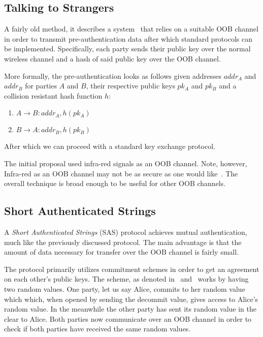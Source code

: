 \documentclass[conference, 12pt]{sty/IEEEtran}
\begin{document}
\subsection{Talking to Strangers}
\label{ssec:talking_to_strangers}

A fairly old method, it describes a system~\cite{balfanz2002talking} that relies on a suitable OOB channel in order to transmit pre-authentication data after which standard protocols can be implemented.
Specifically, each party sends their public key over the normal wireless channel and a hash of said public key over the OOB channel.

More formally, the pre-authentication looks as follows given addresses $addr_A$ and $addr_B$ for parties $A$ and $B$, their respective public keys $pk_A$ and $pk_B$ and a collision resistant hash function $h$:

\begin{enumerate}
    \item $A \rightarrow B: addr_A, h(pk_A)$
    \item $B \rightarrow A: addr_B, h(pk_B)$
\end{enumerate}

After which we can proceed with a standard key exchange protocol.

The initial proposal used infra-red signals as an OOB channel.
Note, however, Infra-red as an OOB channel may not be as secure as one would like~\cite{kumar2009comparative}.
The overall technique is broad enough to be useful for other OOB channels.

\subsection{Short Authenticated Strings}
\label{ssec:short_authenticated_strings}

A \emph{Short Authenticated Strings} (SAS) protocol achieves mutual authentication, much like the previously discussed protocol.
The main advantage is that the amount of data necessary for transfer over the OOB channel is fairly small.

The protocol primarily utilizes commitment schemes in order to get an agreement on each other's public keys.
The scheme, as denoted in~\cite{saxena2008automated} and~\cite{saxena2006secure} works by having two random values.
One party, let us say Alice, commits to her random value which which, when opened by sending the decommit value, gives access to Alice's random value.
In the meanwhile the other party has sent its random value in the clear to Alice.
Both parties now communicate over an OOB channel in order to check if both parties have received the same random values.
\end{document}
